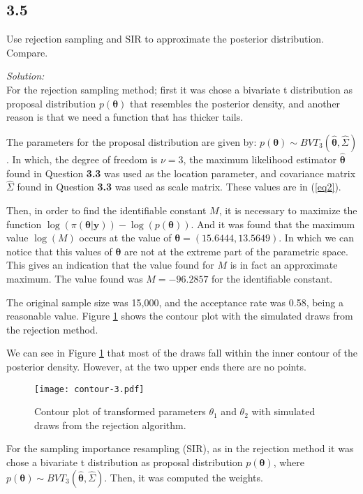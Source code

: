 \documentclass[a4paper, 11pt]{article}
\begin{document}
\subsection*{3.5} Use rejection sampling and SIR to approximate the posterior distribution. Compare.

\noindent
\textit{Solution:}\\

For the rejection sampling method; first it was chose a bivariate t distribution as proposal distribution $p(\boldsymbol{\theta})$ that resembles the posterior density, and another reason is that we need a function that has thicker tails.

The parameters for the proposal distribution are given by: $p(\boldsymbol{\theta}) \sim BVT_{3}(\boldsymbol{\hat{\theta}}, \hat{\Sigma})$. In which, the degree of freedom is $\nu = 3$, the maximum likelihood estimator $\boldsymbol{\hat{\theta}}$ found in Question \textbf{3.3} was used as the location parameter, and covariance matrix $\hat{\Sigma}$ found in Question \textbf{3.3}  was used as scale matrix. These values are in (\ref{eq2}).

Then, in order to find the identifiable constant $M$, it is necessary to maximize the function $\log(\pi(\boldsymbol{\theta}|\textbf{y})) - \log(p(\boldsymbol{\theta}))$. And it was found that the maximum value $\log(M)$ occurs at the value of $\boldsymbol{\theta} = ( 15.6444, 13.5649)$. In which we can notice that this values of $\boldsymbol{\theta}$ are not at the extreme part of the parametric space. This gives an indication that the value found for $M$ is in fact an approximate maximum. The value found was $M = -96.2857$ for the identifiable constant. 

The original sample size was 15,000, and the acceptance rate was 0.58, being a reasonable value. Figure \ref{fig3} shows the contour plot with the simulated draws from the rejection method. 

We can see in Figure \ref{fig3} that most of the draws fall within the inner contour of the posterior density. However, at the two upper ends there are no points.

\begin{figure}[H]
\centering
\caption{Contour plot of transformed parameters $\theta_1$ and $\theta_2$ with simulated draws from the rejection algorithm.}
\label{fig3}
\texttt{[image: contour-3.pdf]}
\end{figure}

For the sampling importance resampling (SIR), as in the rejection method it was chose a bivariate t distribution as proposal distribution $p(\boldsymbol{\theta})$, where $p(\boldsymbol{\theta}) \sim BVT_{3}(\boldsymbol{\hat{\theta}}, \hat{\Sigma})$. Then, it was computed the weights. 
\end{document}
